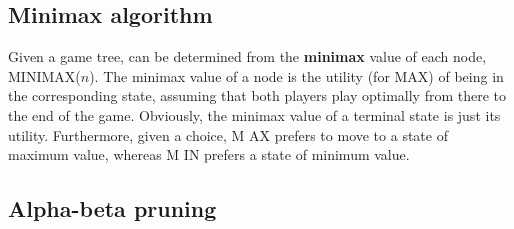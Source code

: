 \documentclass[a4paper, 11pt]{article}
\begin{document}
\subsection*{Minimax algorithm}
Given a game tree, can be determined from the \textbf{minimax} value of each node, MINIMAX($n$).
The minimax value of a node is the utility (for MAX) of being in the corresponding state, assuming that both players play optimally
from there to the end of the game. Obviously, the minimax value of a terminal state is just
its utility. Furthermore, given a choice, M AX prefers to move to a state of maximum value,
whereas M IN prefers a state of minimum value.

\subsection*{Alpha-beta pruning}
\end{document}
